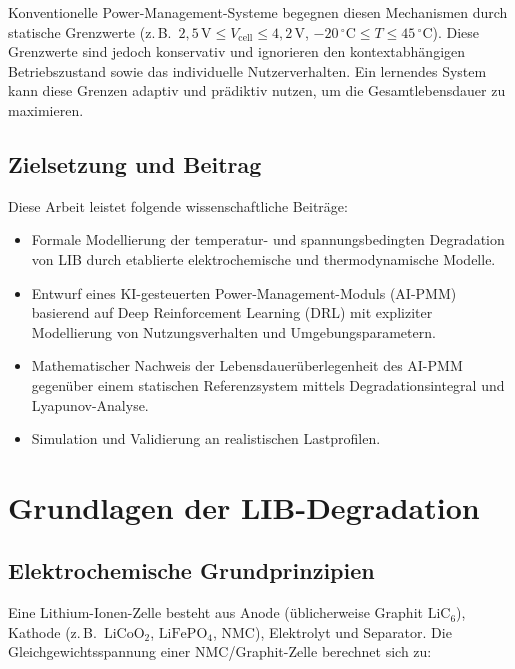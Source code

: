 ﻿\documentclass[12pt,a4paper]{article}
\begin{document}
	Konventionelle Power-Management-Systeme begegnen diesen Mechanismen durch statische
	Grenzwerte (z.\,B.\ $2{,}5\,\mathrm{V} \leq V_\mathrm{cell} \leq 4{,}2\,\mathrm{V}$,
	$-20\,^\circ\mathrm{C} \leq T \leq 45\,^\circ\mathrm{C}$). Diese Grenzwerte sind
	jedoch konservativ und ignorieren den kontextabhängigen Betriebszustand sowie
	das individuelle Nutzerverhalten. Ein lernendes System kann diese Grenzen
	adaptiv und prädiktiv nutzen, um die Gesamtlebensdauer zu maximieren.
	
	\subsection{Zielsetzung und Beitrag}
	
	Diese Arbeit leistet folgende wissenschaftliche Beiträge:
	
	\begin{itemize}[leftmargin=*]
		\item Formale Modellierung der temperatur- und spannungsbedingten Degradation
		von LIB durch etablierte elektrochemische und thermodynamische Modelle.
		\item Entwurf eines KI-gesteuerten Power-Management-Moduls (AI-PMM) basierend
		auf Deep Reinforcement Learning (DRL) mit expliziter Modellierung von Nutzungsverhalten
		und Umgebungsparametern.
		\item Mathematischer Nachweis der Lebensdauerüberlegenheit des AI-PMM gegenüber
		einem statischen Referenzsystem mittels Degradationsintegral und Lyapunov-Analyse.
		\item Simulation und Validierung an realistischen Lastprofilen.
	\end{itemize}
	
	\section{Grundlagen der LIB-Degradation}
	\label{sec:grundlagen}
	
	\subsection{Elektrochemische Grundprinzipien}
	
	Eine Lithium-Ionen-Zelle besteht aus Anode (üblicherweise Graphit $\mathrm{LiC_6}$),
	Kathode (z.\,B.\ $\mathrm{LiCoO_2}$, $\mathrm{LiFePO_4}$, NMC), Elektrolyt
	und Separator. Die Gleichgewichtsspannung einer NMC/Graphit-Zelle berechnet sich
	zu:
	
\end{document}
